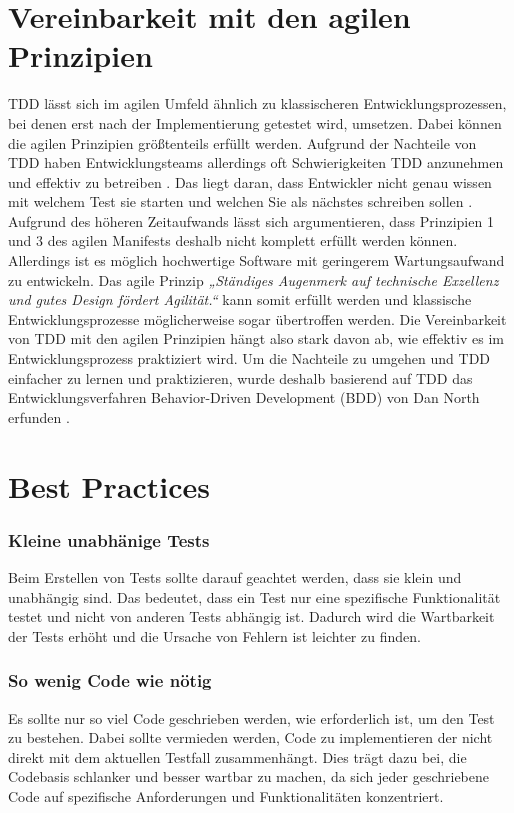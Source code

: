 \documentclass[a0,landscape]{a0poster}
\begin{document}
\begin{multicols}{4}
\section*{Vereinbarkeit mit den agilen Prinzipien}
TDD lässt sich im agilen Umfeld ähnlich zu klassischeren Entwicklungsprozessen, bei denen erst nach der Implementierung getestet wird, umsetzen. Dabei können die agilen Prinzipien größtenteils erfüllt werden.
\newline 
Aufgrund der Nachteile von TDD haben Entwicklungsteams allerdings oft Schwierigkeiten TDD anzunehmen und effektiv zu betreiben \cite{smart2023bdd}.  
Das liegt daran, dass Entwickler nicht genau wissen mit welchem Test sie starten und welchen Sie als nächstes schreiben sollen \cite{smart2023bdd}. 
\newline 
Aufgrund des höheren Zeitaufwands lässt sich argumentieren, dass Prinzipien 1 und 3 des agilen Manifests deshalb nicht komplett erfüllt werden können.
\newline 
Allerdings ist es möglich hochwertige Software mit geringerem Wartungsaufwand zu entwickeln. Das agile Prinzip \textit{„Ständiges Augenmerk auf technische Exzellenz und gutes Design fördert Agilität.“} kann somit erfüllt werden und klassische Entwicklungsprozesse möglicherweise sogar übertroffen werden.
\newline 
Die Vereinbarkeit von TDD mit den agilen Prinzipien hängt also stark davon ab, wie effektiv es im Entwicklungsprozess praktiziert wird.
\newline 
Um die Nachteile zu umgehen und TDD einfacher zu lernen und praktizieren, wurde deshalb basierend auf TDD das Entwicklungsverfahren Behavior-Driven Development (BDD) von Dan North erfunden \cite{smart2023bdd}.


\section*{Best Practices}

\subsubsection*{Kleine unabhänige Tests}
Beim Erstellen von Tests sollte darauf geachtet werden, dass sie klein und unabhängig sind. Das bedeutet, dass ein Test nur eine spezifische Funktionalität testet und nicht von anderen Tests abhängig ist. Dadurch wird die Wartbarkeit der Tests erhöht und die Ursache von Fehlern ist leichter zu finden.

\subsubsection*{So wenig Code wie nötig}
Es sollte nur so viel Code geschrieben werden, wie erforderlich ist, um den Test zu bestehen. Dabei sollte vermieden werden, Code zu implementieren der nicht direkt mit dem aktuellen Testfall zusammenhängt. Dies trägt dazu bei, die Codebasis schlanker und besser wartbar zu machen, da sich jeder geschriebene Code auf spezifische Anforderungen und Funktionalitäten konzentriert.


\end{multicols}
\end{document}
